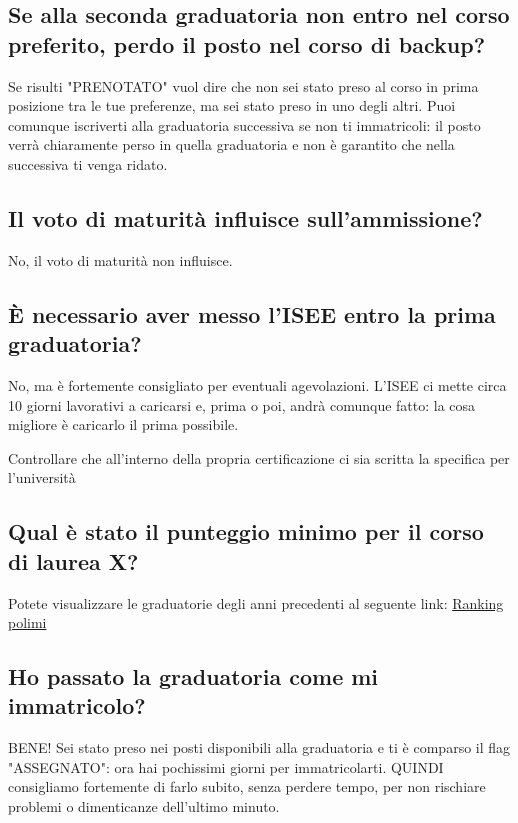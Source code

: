 \documentclass[legal]{polinetwork}
\begin{document}
\subsection{Se alla seconda graduatoria non entro nel corso preferito, perdo il posto nel corso di backup?}


Se risulti "PRENOTATO" vuol dire che non sei stato preso al corso in prima posizione tra le tue preferenze, ma sei stato preso in uno degli altri. Puoi comunque iscriverti alla graduatoria successiva se non ti immatricoli: il posto verrà chiaramente perso in quella graduatoria e non è garantito che nella successiva ti venga ridato.

\subsection{Il voto di maturità influisce sull'ammissione?}


No, il voto di maturità non influisce.

\subsection{È necessario aver messo l'ISEE entro la prima graduatoria?}


No, ma è fortemente consigliato per eventuali agevolazioni. L'ISEE ci mette circa 10 giorni lavorativi a caricarsi e, prima o poi, andrà comunque fatto: la cosa migliore è caricarlo il prima possibile.

Controllare che all'interno della propria certificazione ci sia scritta la specifica per l'università

\subsection{Qual è stato il punteggio minimo per il corso di laurea X?}


Potete visualizzare le graduatorie degli anni precedenti al seguente link: \href{https://rankings.polinetwork.org/}{Ranking polimi}

\subsection{Ho passato la graduatoria come mi immatricolo?}


BENE! Sei stato preso nei posti disponibili alla graduatoria e ti è comparso il flag "ASSEGNATO": ora hai pochissimi giorni per immatricolarti. QUINDI consigliamo fortemente di farlo subito, senza perdere tempo, per non rischiare problemi o dimenticanze dell'ultimo minuto.
\end{document}
